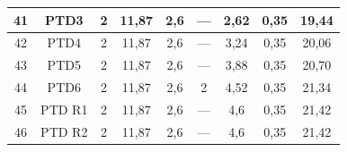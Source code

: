 \documentclass[	DIV=calc,%
							paper=a4,%
							fontsize=12pt,%
							onecolumn]{scrartcl}	 					%
\begin{document}
{\begin{tabular}{|c|c|c|c|c|c|c|c|c|}
	41                 & PTD3               & 2                                                    & 11,87                                       & 2,6                                           & ---                                           & 2,62                                             & 0,35                                            & 19,44                                                             \\ \hline
	42                 & PTD4               & 2                                                    & 11,87                                       & 2,6                                           & ---                                           & 3,24                                             & 0,35                                            & 20,06                                                             \\ \hline
	43                 & PTD5               & 2                                                    & 11,87                                       & 2,6                                           & ---                                           & 3,88                                             & 0,35                                            & 20,70                                                             \\ \hline
	44                 & PTD6               & 2                                                    & 11,87                                       & 2,6                                           & 2                                             & 4,52                                             & 0,35                                            & 21,34                                                             \\ \hline
	45                 & PTD R1             & 2                                                    & 11,87                                       & 2,6                                           & ---                                           & 4,6                                              & 0,35                                            & 21,42                                                             \\ \hline
	46                 & PTD R2             & 2                                                    & 11,87                                       & 2,6                                           & ---                                           & 4,6                                              & 0,35                                            & 21,42                                                             \\ \hline

\end{tabular}}
\end{document}
